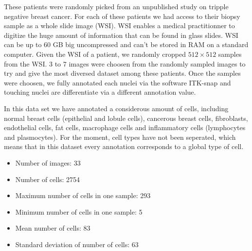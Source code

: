 \documentclass{article}
\begin{document}
These patients were randomly picked from an unpublished study on
tripple negative breast cancer. For each of these patients we had access
to their biopsy sample as a whole slide image (WSI). WSI enables a
medical practitionner to digitize the huge amount of information that
can be found in glass slides. WSI can be up to 60 GB big
uncompressed and can't be stored in RAM on a standard computer. Given
the WSI of a patient, we randomly cropped $512 \times 512$ samples 
from the WSI. %
3 to 7 images were choosen from the randomly sampled images to try and give the most diversed dataset among these patients. Once the samples were choosen, we fully annotated each nuclei via the software ITK-snap and touching nuclei are differentiate via a different annotation value.

In this data set we have annotated a considerous amount of cells, 
including normal breast cells (epithelial and lobule cells),  cancerous 
breast cells, fibroblasts,  endothelial cells, fat cells, macrophage cells and 
inflammatory cells (lymphocytes and plasmocytes). For the moment, cell types have not been seperated, which means that in this dataset every annotation corresponds to a global type of cell. 

\begin{itemize}
\item Number of images: 33 \\
\item Number  of cells: 2754 \\
\item Maximum number of cells in one sample: 293 \\
\item Minimum number of cells in one sample: 5 \\
\item Mean number of cells: 83 \\
\item Standard deviation of number of cells: 63 \\
\end{itemize}
\end{document}
